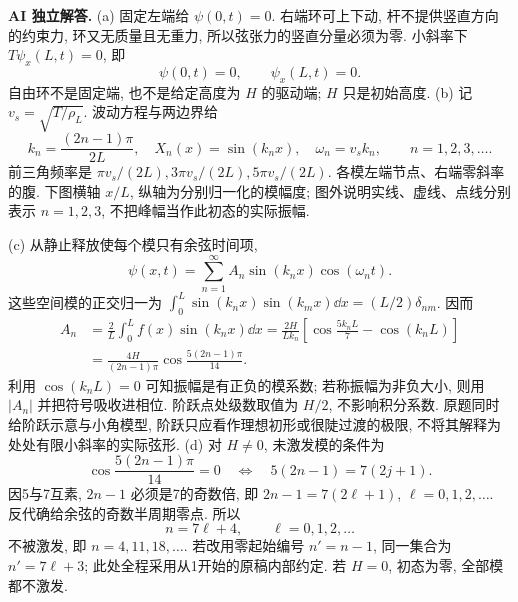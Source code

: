 \begin{solution}
\textbf{AI 独立解答.}
(a) 固定左端给 $\psi(0,t)=0$. 右端环可上下动, 杆不提供竖直方向的约束力, 环又无质量且无重力, 所以弦张力的竖直分量必须为零. 小斜率下 $T\psi_x(L,t)=0$, 即
\[
\boxed{\psi(0,t)=0,\qquad\psi_x(L,t)=0}.
\]
自由环不是固定端, 也不是给定高度为 $H$ 的驱动端; $H$ 只是初始高度.
(b) 记 $v_s=\sqrt{T/\rho_L}$. 波动方程与两边界给
\[
k_n=\frac{(2n-1)\pi}{2L},\quad X_n(x)=\sin(k_nx),\quad
\omega_n=v_sk_n,\qquad n=1,2,3,\ldots.
\]
前三角频率是 $\pi v_s/(2L),3\pi v_s/(2L),5\pi v_s/(2L)$. 各模左端节点、右端零斜率的腹. 下图横轴 $x/L$, 纵轴为分别归一化的模幅度; 图外说明实线、虚线、点线分别表示 $n=1,2,3$, 不把峰幅当作此初态的实际振幅.
\begin{center}\end{center}
(c) 从静止释放使每个模只有余弦时间项,
\[
\psi(x,t)=\sum_{n=1}^{\infty}A_n\sin(k_nx)\cos(\omega_nt).
\]
这些空间模的正交归一为 $\int_0^L\sin(k_nx)\sin(k_mx)\dd x=(L/2)\delta_{nm}$. 因而
\[
\begin{aligned}
A_n&=\frac2L\int_0^Lf(x)\sin(k_nx)\dd x
=\frac{2H}{Lk_n}\left[\cos\frac{5k_nL}{7}-\cos(k_nL)\right]\\
&=\boxed{\frac{4H}{(2n-1)\pi}\cos\frac{5(2n-1)\pi}{14}}.
\end{aligned}
\]
利用 $\cos(k_nL)=0$ 可知振幅是有正负的模系数; 若称振幅为非负大小, 则用 $|A_n|$ 并把符号吸收进相位. 阶跃点处级数取值为 $H/2$, 不影响积分系数. 原题同时给阶跃示意与小角模型, 阶跃只应看作理想初形或很陡过渡的极限, 不将其解释为处处有限小斜率的实际弦形.
(d) 对 $H\ne0$, 未激发模的条件为
\[
\cos\frac{5(2n-1)\pi}{14}=0
\quad\Longleftrightarrow\quad
5(2n-1)=7(2j+1).
\]
因5与7互素, $2n-1$ 必须是7的奇数倍, 即 $2n-1=7(2\ell+1)$, $\ell=0,1,2,\ldots$. 反代确给余弦的奇数半周期零点. 所以
\[
\boxed{n=7\ell+4,\qquad \ell=0,1,2,\ldots}
\]
不被激发, 即 $n=4,11,18,\ldots$. 若改用零起始编号 $n'=n-1$, 同一集合为 $n'=7\ell+3$; 此处全程采用从1开始的原稿内部约定. 若 $H=0$, 初态为零, 全部模都不激发.
\end{solution}
